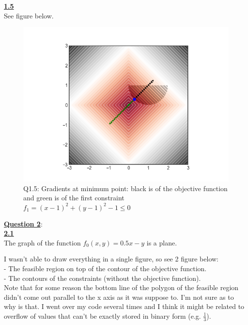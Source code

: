 \documentclass[fleqn]{article}
\begin{document}
\underline{\textbf{1.5}} \\
See figure below. \\

\begin{figure}[h!]
\includegraphics[width=0.8\linewidth]{q1_5.PNG}
\caption{Q1.5: Gradients at minimum point: black is of the objective function and green is of the first constraint $f_1 = (x-1)^2+(y-1)^2-1 \leq 0$}
\end{figure}




\clearpage\underline{\textbf{Question 2}}:\\

\underline{\textbf{2.1}} \\
The graph of the function $f_0(x,y) = 0.5x-y$ is a plane.

I wasn't able to draw everything in a single figure, so see 2 figure below:\\
- The feasible region on top of the contour of the objective function. \\
- The contours of the constraints (without the objective function). \\

Note that for some reason the bottom line of the polygon of the feasible region didn't come out parallel to the x axis as it was suppose to. I'm not sure as to why is that. I went over my code several times and I think it might be related to overflow of values that can't be exactly stored in binary form (e.g. $\frac{1}{3}$).\\
\end{document}
